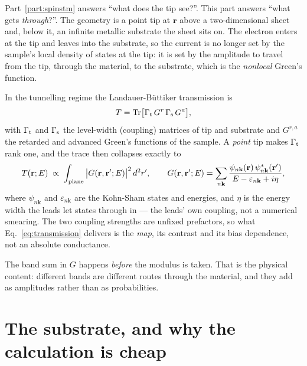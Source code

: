\documentclass[11pt]{article}
\begin{document}
Part~\ref{part:spinstm} answers ``what does the tip see?''. This part answers
``what gets \emph{through}?''. The geometry is a point tip at $\mathbf r$
above a two-dimensional sheet and, below it, an infinite metallic substrate
the sheet sits on. The electron enters at the tip and leaves into the
substrate, so the current is no longer set by the sample's local density of
states at the tip: it is set by the amplitude to travel from the tip, through
the material, to the substrate, which is the \emph{nonlocal} Green's function.

In the tunnelling regime the Landauer-B\"uttiker transmission is
\begin{equation}
  T = \mathrm{Tr}\big[\Gamma_{\rm t}\,G^r\,\Gamma_{\rm s}\,G^a\big],
  \label{eq:landauer}
\end{equation}
with $\Gamma_{\rm t}$ and $\Gamma_{\rm s}$ the level-width (coupling) matrices
of tip and substrate and $G^{r,a}$ the retarded and advanced Green's functions
of the sample. A \emph{point} tip makes $\Gamma_{\rm t}$ rank one, and the
trace then collapses exactly to
\begin{equation}
  T(\mathbf r;E)\;\propto\;\int_{\rm plane}
    \big|G(\mathbf r,\mathbf r';E)\big|^2\,d^2r',
  \qquad
  G(\mathbf r,\mathbf r';E)=\sum_{n\mathbf k}
    \frac{\psi_{n\mathbf k}(\mathbf r)\,\psi^*_{n\mathbf k}(\mathbf r')}
         {E-\varepsilon_{n\mathbf k}+i\eta},
  \label{eq:transmission}
\end{equation}
where $\psi_{n\mathbf k}$ and $\varepsilon_{n\mathbf k}$ are the Kohn-Sham
states and energies, and $\eta$ is the energy width the leads let states
through in --- the leads' own coupling, not a numerical smearing. The two
coupling strengths are unfixed prefactors, so what Eq.~\eqref{eq:transmission}
delivers is the \emph{map}, its contrast and its bias dependence, not an
absolute conductance.

The band sum in $G$ happens \emph{before} the modulus is taken. That is the
physical content: different bands are different routes through the material,
and they add as amplitudes rather than as probabilities.

\section{The substrate, and why the calculation is cheap}
\end{document}
